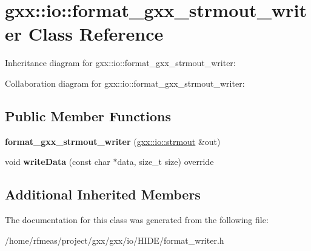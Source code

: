 \hypertarget{classgxx_1_1io_1_1format__gxx__strmout__writer}{}\section{gxx\+:\+:io\+:\+:format\+\_\+gxx\+\_\+strmout\+\_\+writer Class Reference}
\label{classgxx_1_1io_1_1format__gxx__strmout__writer}


Inheritance diagram for gxx\+:\+:io\+:\+:format\+\_\+gxx\+\_\+strmout\+\_\+writer\+:


Collaboration diagram for gxx\+:\+:io\+:\+:format\+\_\+gxx\+\_\+strmout\+\_\+writer\+:
\subsection*{Public Member Functions}
\begin{DoxyCompactItemize}
\item 
{\bfseries format\+\_\+gxx\+\_\+strmout\+\_\+writer} (\hyperlink{classgxx_1_1io_1_1strmout}{gxx\+::io\+::strmout} \&out)\hypertarget{classgxx_1_1io_1_1format__gxx__strmout__writer_aad66b83b1ab1ff276a3da2dce8c99e06}{}\label{classgxx_1_1io_1_1format__gxx__strmout__writer_aad66b83b1ab1ff276a3da2dce8c99e06}

\item 
void {\bfseries write\+Data} (const char $\ast$data, size\+\_\+t size) override\hypertarget{classgxx_1_1io_1_1format__gxx__strmout__writer_a9eeb277f7026b6a37552622c5e9eaac0}{}\label{classgxx_1_1io_1_1format__gxx__strmout__writer_a9eeb277f7026b6a37552622c5e9eaac0}

\end{DoxyCompactItemize}
\subsection*{Additional Inherited Members}


The documentation for this class was generated from the following file\+:\begin{DoxyCompactItemize}
\item 
/home/rfmeas/project/gxx/gxx/io/\+H\+I\+D\+E/format\+\_\+writer.\+h\end{DoxyCompactItemize}
